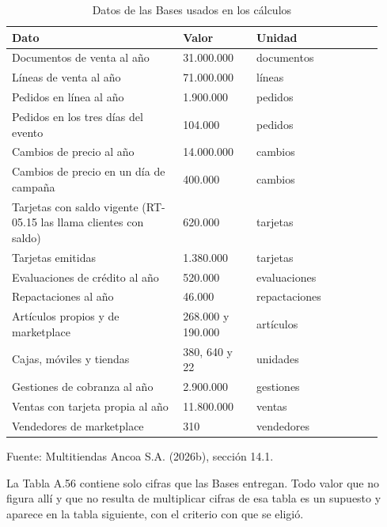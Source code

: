 \documentclass[11pt]{article}
\begin{document}
\clearpage

\begin{table}[htbp]
\caption{Datos de las Bases usados en los cálculos}\label{tab:datos_caso}
\centering
\begin{tabular}{@{}p{0.424\linewidth}p{0.185\linewidth}p{0.318\linewidth}@{}}
\toprule Dato & Valor & Unidad \\
\midrule
Documentos de venta al año & 31.000.000 & documentos \\
Líneas de venta al año & 71.000.000 & líneas \\
Pedidos en línea al año & 1.900.000 & pedidos \\
Pedidos en los tres días del evento & 104.000 & pedidos \\
Cambios de precio al año & 14.000.000 & cambios \\
Cambios de precio en un día de campaña & 400.000 & cambios \\
Tarjetas con saldo vigente (RT-05.15 las llama clientes con saldo) & 620.000 & tarjetas \\
Tarjetas emitidas & 1.380.000 & tarjetas \\
Evaluaciones de crédito al año & 520.000 & evaluaciones \\
Repactaciones al año & 46.000 & repactaciones \\
Artículos propios y de marketplace & 268.000 y 190.000 & artículos \\
Cajas, móviles y tiendas & 380, 640 y 22 & unidades \\
Gestiones de cobranza al año & 2.900.000 & gestiones \\
Ventas con tarjeta propia al año & 11.800.000 & ventas \\
Vendedores de marketplace & 310 & vendedores \\
\bottomrule
\end{tabular}
\par\smallskip
{\raggedright Fuente: Multitiendas Ancoa S.A. (2026b), sección 14.1.\par}
\end{table}

La Tabla A.56 contiene solo cifras que las Bases entregan. Todo valor que no figura allí y que no resulta de multiplicar cifras de esa tabla es un supuesto y aparece en la tabla siguiente, con el criterio con que se eligió.
\end{document}
